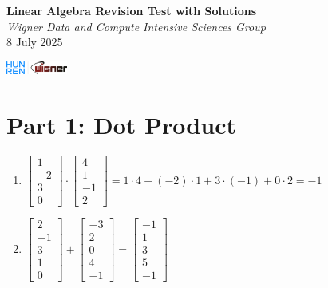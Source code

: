 \documentclass{article}
\begin{document}
\begin{minipage}{0.8\textwidth}
    \centering
    {\Large\textbf{Linear Algebra Revision Test with Solutions}\\ \textit{Wigner Data and Compute Intensive Sciences Group}}\\
	\vspace*{0.25cm}
	{\normalsize 8 July 2025}
\end{minipage}
\begin{minipage}{0.2\textwidth}
    \includegraphics[width=2cm]{img/logo.png}
\end{minipage}

\section*{Part 1: Dot Product}
\begin{enumerate}
\item $\begin{bmatrix} 1 \\ -2 \\ 3 \\ 0 \end{bmatrix} \cdot \begin{bmatrix} 4 \\ 1 \\ -1 \\ 2 \end{bmatrix} = 1\cdot4 + (-2)\cdot1 + 3\cdot(-1) + 0\cdot2 = \boxed{-1}$

\item $\begin{bmatrix} 2 \\ -1 \\ 3 \\ 1 \\ 0 \end{bmatrix} + \begin{bmatrix} -3 \\ 2 \\ 0 \\ 4 \\ -1 \end{bmatrix} = \boxed{\begin{bmatrix} -1 \\ 1 \\ 3 \\ 5 \\ -1 \end{bmatrix}}$
\end{enumerate}
\end{document}
